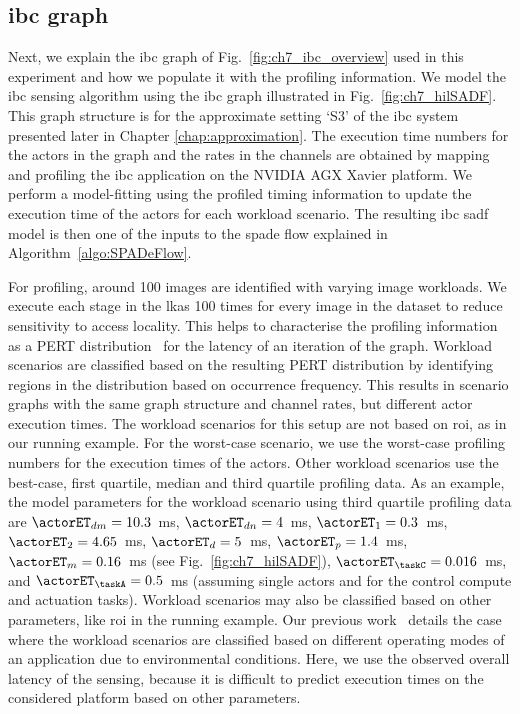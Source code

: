 \subsection{\texorpdfstring{\Gls{ibc}}{IBC} graph}
Next, we explain the \gls{ibc} graph of Fig.~\ref{fig:ch7_ibc_overview} used in this experiment and how we populate it with the profiling information. 
We model the \gls{ibc} sensing algorithm using the \gls{ibc} graph illustrated in Fig.~\ref{fig:ch7_hilSADF}. 
 This graph structure is for the approximate setting `S3' of the \gls{ibc} system presented later in Chapter \ref{chap:approximation}.
 The execution time numbers for the actors in the graph and the rates in the channels are obtained by mapping and profiling the \gls{ibc} application on the NVIDIA AGX Xavier platform.
We perform a model-fitting using the profiled timing information to update the execution time of the actors for each workload scenario. 
 The resulting \gls{ibc} \gls{sadf} model is then one of the inputs to the \gls{spade} flow explained in Algorithm~\ref{algo:SPADeFlow}.
 
 For profiling, around 100 images are identified with varying image workloads. We execute each stage in the \gls{lkas} 100 times for every image in the dataset to reduce sensitivity to access locality.
 This helps to characterise the profiling information as a PERT distribution~\cite{adyanthaya2014robustness} for the latency of an iteration of the graph.
 Workload scenarios are classified based on the resulting PERT distribution by identifying regions in the distribution based on occurrence frequency.
 This results in scenario graphs with the same graph structure and channel rates, but  different actor execution times.
 The workload scenarios for this setup are not based on \gls{roi}, as in our running example.
 For the worst-case scenario, we use the worst-case profiling numbers for the execution times of the actors. 
 Other workload scenarios use the best-case, first quartile, median and third quartile profiling data.
 As an example, the model parameters for the workload scenario using third quartile profiling data are $\actorET_{dm}=10.3$~ms,  $\actorET_{dn}=4$~ms, $\actorET_{1}=0.3$~ms, $\actorET_{2}=4.65$~ms, $\actorET_{d}=5$~ms, $\actorET_{p}=1.4$~ms, $\actorET_{m}=0.16$~ms (see Fig.~\ref{fig:ch7_hilSADF}), $\actorET_{\taskC}=0.016$~ms, and $\actorET_{\taskA}=0.5$~ms (assuming single actors \taskC and \taskA for the control compute and actuation tasks).
Workload scenarios may also be classified based on other parameters, like \gls{roi} in the running example.
Our previous work~\cite{mohamed2020scenario} details the case where the workload scenarios are classified based on different operating modes of an application due to environmental conditions. Here, we use the observed overall latency of the sensing, because it is difficult to predict execution times on the considered platform based on other parameters. 

